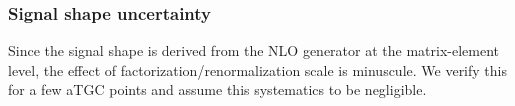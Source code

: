 \subsubsection{Signal shape uncertainty}
Since the signal shape is derived from the 
NLO generator at the matrix-element level, the effect of 
factorization/renormalization scale is minuscule.
We verify this for a few aTGC points and assume 
this systematics to be negligible.






